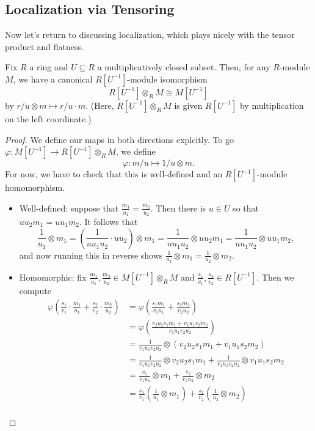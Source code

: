 \subsection{Localization via Tensoring}
Now let's return to discussing localization, which plays nicely with the tensor product and flatness.
\begin{proposition}
	Fix $R$ a ring and $U\subseteq R$ a multiplicatively closed subset. Then, for any $R$-module $M$, we have a canonical $R\left[U^{-1}\right]$-module isomorphism
	\[R\left[U^{-1}\right]\otimes_RM\cong M\left[U^{-1}\right]\]
	by $r/u\otimes m\mapsto r/u\cdot m$. (Here, $R\left[U^{-1}\right]\otimes_RM$ is given $R\left[U^{-1}\right]$ by multiplication on the left coordinate.)
\end{proposition}
\begin{proof}
	We define our maps in both directions explcitly. To go $\varphi:M\left[U^{-1}\right]\to R\left[U^{-1}\right]\otimes_RM$, we define
	\[\boxed{\varphi:m/u\mapsto1/u\otimes m}.\]
	For now, we have to check that this is well-defined and an $R\left[U^{-1}\right]$-module homomorphism.
	\begin{itemize}
		\item Well-defined: suppose that $\frac{m_1}{u_1}=\frac{m_2}{u_2}$. Then there is $u\in U$ so that $uu_2m_1=uu_1m_2$. It follows that
		\[\frac1{u_1}\otimes m_1=\left(\frac1{uu_1u_2}\cdot uu_2\right)\otimes m_1=\frac1{uu_1u_2}\otimes uu_2m_1=\frac1{uu_1u_2}\otimes uu_1m_2,\]
		and now running this in reverse shows $\frac1{u_1}\otimes m_1=\frac1{u_2}\otimes m_2$.
		\item Homomorphic: fix $\frac{m_1}{u_1},\frac{m_2}{u_2}\in M\left[U^{-1}\right]\otimes_RM$ and $\frac{s_1}{v_1},\frac{s_2}{v_2}\in R\left[U^{-1}\right]$. Then we compute
		\begin{align*}
			\varphi\left(\frac{s_1}{v_1}\cdot\frac{m_1}{u_1}+\frac{s_2}{v_2}\cdot\frac{m_2}{u_2}\right) &= \varphi\left(\frac{s_1m_1}{v_1u_1}+\frac{s_2m_2}{v_2u_2}\right) \\
			&= \varphi\left(\frac{v_2u_2s_1m_1+v_1u_1s_2m_2}{v_1u_1v_2u_2}\right) \\
			&= \frac1{v_1u_1v_2u_2}\otimes(v_2u_2s_1m_1+v_1u_1s_2m_2) \\
			&= \frac1{v_1u_1v_2u_2}\otimes v_2u_2s_1m_1+\frac1{v_1u_1v_2u_2}\otimes v_1u_1s_2m_2 \\
			&= \frac{s_1}{v_1u_1}\otimes m_1+\frac{s_2}{v_2u_2}\otimes m_2 \\
			&= \frac{s_1}{v_1}\left(\frac1{u_1}\otimes m_1\right)+\frac{s_2}{v_2}\left(\frac1{u_2}\otimes m_2\right) \\

\end{align*}
\end{itemize}
\end{proof}
